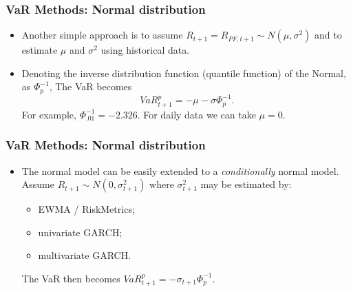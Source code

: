 \begin{frame}%

\frametitle{VaR Methods: Normal distribution}
\begin{itemize}
\item Another simple approach is to
assume $R_{t+1}=R_{PF,t+1}\sim N(\mu ,\sigma ^{2})$ and to estimate $\mu $
and $\sigma ^{2}$ using historical data.

\item Denoting the inverse distribution function (quantile function) of the Normal, as $\Phi _{p}^{-1}$, The VaR becomes
\begin{equation*}
VaR_{t+1}^{p}=-\mu -\sigma \Phi _{p}^{-1}.
\end{equation*}%
For example, $\Phi _{.01}^{-1}=-2.326$. For daily data we can take $\mu =0$.
\end{itemize}

\end{frame}%
\begin{frame}%

\frametitle{VaR Methods: Normal distribution}

\begin{itemize}


\item The normal model can be easily extended to a \emph{\color{red}%
conditionally} normal model. Assume $R_{t+1}\sim N(0,\sigma
_{t+1}^{2}) $ where $\sigma _{t+1}^{2}$ may be estimated by:

\begin{itemize}
\item EWMA / RiskMetrics;

\item univariate GARCH;

\item multivariate GARCH.
\end{itemize}

The VaR then becomes $VaR_{t+1}^{p}=-\sigma _{t+1}\Phi _{p}^{-1}$.
\end{itemize}

\end{frame}%


